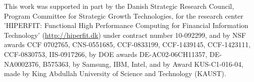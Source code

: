 \documentclass[10pt,nocopyrightspace]{sigplanconf}
\begin{document}
This work was supported in part by
the Danish Strategic Research Council, Program Committee for Strategic Growth
Technologies, for the research center 'HIPERFIT: Functional High
Performance Computing for Financial Information Technology'
(\url{http://hiperfit.dk}) under contract number 10-092299,
and by 
NSF awards
CCF 0702765, %
CNS-0551685, %
CCF-0833199, %
CCF-1439145, %
CCF-1423111, %
CCF-0830753, %
IIS-0917266, %
by DOE awards
DE-AC02-06CH11357, %
DE-NA0002376, %
B575363,  %
by Samsung, IBM, Intel, and
by Award KUS-C1-016-04, made by King Abdullah University of Science and Technology (KAUST).






%





\end{document}
